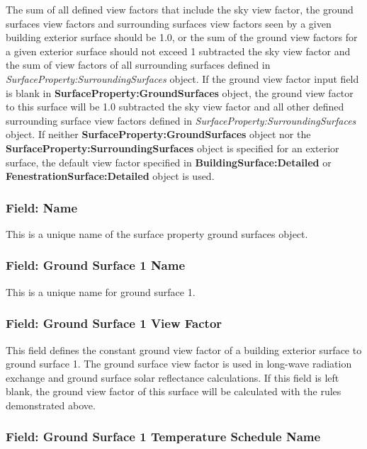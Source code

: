 The sum of all defined view factors that include the sky view factor, the ground surfaces view factors and surrounding surfaces view factors seen by a given building exterior surface should be 1.0, or the sum of the ground view factors for a given exterior surface should not exceed 1 subtracted the sky view factor and the sum of view factors of all surrounding surfaces defined in \textit{SurfaceProperty:SurroundingSurfaces} object. If the ground view factor input field is blank in \textbf{SurfaceProperty:GroundSurfaces} object, the ground view factor to this surface will be 1.0 subtracted the sky view factor and all other defined surrounding surface view factors defined in \textit{SurfaceProperty:SurroundingSurfaces} object. If neither \textbf{SurfaceProperty:GroundSurfaces} object nor the \textbf{SurfaceProperty:SurroundingSurfaces} object is specified for an exterior surface, the default view factor specified in \textbf{BuildingSurface:Detailed} or \textbf{FenestrationSurface:Detailed} object is used.

\subsubsection{Field: Name}\label{field-gnd-surfs-name}

This is a unique name of the surface property ground surfaces object.

\subsubsection{Field: Ground Surface 1 Name}\label{field-ground-surface-1-name}

This is a unique name for ground surface 1.

\subsubsection{Field: Ground Surface 1 View Factor}\label{field-ground-surface-1-view-factor}

This field defines the constant ground view factor of a building exterior surface to ground surface 1. The ground surface view factor is used in long-wave radiation exchange and ground surface solar reflectance calculations. If this field is left blank, the ground view factor of this surface will be calculated with the rules demonstrated above.

\subsubsection{Field: Ground Surface 1 Temperature Schedule Name}\label{field-ground-surface-1-temp-schedule-name}

